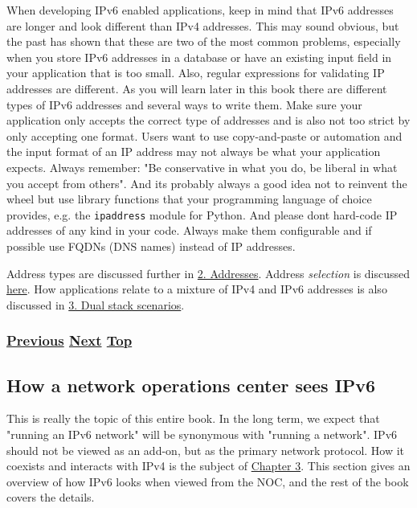 \documentclass[
]{article}
\begin{document}
When developing IPv6 enabled applications, keep in mind that IPv6
addresses are longer and look different than IPv4 addresses. This may
sound obvious, but the past has shown that these are two of the most
common problems, especially when you store IPv6 addresses in a database
or have an existing input field in your application that is too small.
Also, regular expressions for validating IP addresses are different. As
you will learn later in this book there are different types of IPv6
addresses and several ways to write them. Make sure your application
only accepts the correct type of addresses and is also not too strict by
only accepting one format. Users want to use copy-and-paste or
automation and the input format of an IP address may not always be what
your application expects. Always remember: "Be conservative in what you
do, be liberal in what you accept from others". And it\textquotesingle s
probably always a good idea not to reinvent the wheel but use library
functions that your programming language of choice provides, e.g. the
\texttt{ipaddress} module for Python. And please don\textquotesingle t
hard-code IP addresses of any kind in your code. Always make them
configurable and if possible use FQDNs (DNS names) instead of IP
addresses.

Address types are discussed further in \hyperref[addresses]{2.
Addresses}. Address \emph{selection} is discussed
\hyperref[source-and-destination-address-selection]{here}. How
applications relate to a mixture of IPv4 and IPv6 addresses is also
discussed in \hyperref[dual-stack-scenarios]{3. Dual stack scenarios}.

\subsubsection{\texorpdfstring{\hyperref[how-a-user-sees-ipv6]{Previous}
\hyperref[how-a-network-operations-center-sees-ipv6]{Next}
\hyperref[introduction-and-foreword]{Top}}{Previous Next Top}}\label{previous-next-top-2}

\pagebreak

\subsection{How a network operations center sees
IPv6}\label{how-a-network-operations-center-sees-ipv6}

This is really the topic of this entire book. In the long term, we
expect that "running an IPv6 network" will be synonymous with "running a
network". IPv6 should not be viewed as an add-on, but as the primary
network protocol. How it coexists and interacts with IPv4 is the subject
of
\href{https://github.com/becarpenter/book6/tree/main/3.\%20Coexistence\%20with\%20legacy\%20IPv4}{Chapter
3}. This section gives an overview of how IPv6 looks when viewed from
the NOC, and the rest of the book covers the details.
\end{document}
